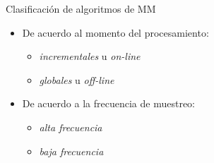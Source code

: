 \begin{frame}[c]{Clasificación de algoritmos de MM}
	\Large
	\begin{itemize}	 	
		\item De acuerdo al momento del procesamiento:
		\begin{itemize}
			\large
			\item \emph{incrementales} u \emph{on-line}
			\item \emph{globales} u \emph{off-line}
		\end{itemize}
		\vspace{\baselineskip}
		\item De acuerdo a la frecuencia de muestreo:
		\begin{itemize}
			\large
			\item \emph{alta frecuencia}
			\item \emph{baja frecuencia}
		\end{itemize}
	\end{itemize}
\end{frame}
